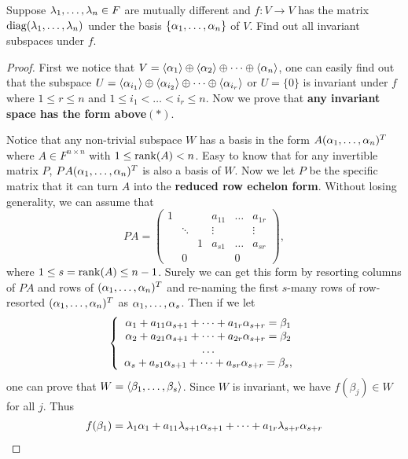 \begin{pro}%
	Suppose $\lambda_1,\dots,\lambda_n\in F$ are mutually different and $f\colon V\to V$ has the matrix $\operatorname*{diag}(\lambda_1,\dots,\lambda_n)$ under the basis $\{\alpha_1,\dots,\alpha_n\}$ of $V$. Find out all invariant subspaces under $f$.
\end{pro}
\begin{proof}
	First we notice that $V=\left\langle \alpha_1\right\rangle\oplus\left\langle \alpha_2\right\rangle\oplus\dots\oplus\left\langle \alpha_n\right\rangle$, one can easily find out that the subspace $U=\left\langle \alpha_{i_1}\right\rangle\oplus\left\langle \alpha_{i_2}\right\rangle\oplus\dots\oplus\left\langle \alpha_{i_r}\right\rangle$ or $U=\{0\}$ is invariant under $f$ where $1\leq r\leq n$ and $1\leq i_1< \dots< i_r\leq n$. Now we prove that \textbf{any invariant space has the form above}\;$(*)$. 

	Notice that any non-trivial subspace $W$ has a basis in the form $A(\alpha_1,\dots,\alpha_n)^T$ where $A\in F^{n\times n}$ with $1\leq \operatorname*{rank}(A)<n$. Easy to know that for any invertible matrix $P$, $PA(\alpha_1,\dots,\alpha_n)^T$ is also a basis of $W$. Now we let $P$ be the specific matrix that it can turn $A$ into the \textbf{reduced row echelon form}. Without losing generality, we can assume that
	\[PA=\begin{pmatrix}
	1 & & & a_{11} & \dots & a_{1r}\\
	  &\ddots &  &\vdots& &\vdots\\
	  & & 1 & a_{s1} & \dots & a_{sr}\\
	  &0&   &        & 0 &\end{pmatrix},\]
	where $1\leq s=\operatorname*{rank}(A)\leq n-1$.
	Surely we can get this form by resorting columns of $PA$ and rows of $(\alpha_1,\dots,\alpha_n)^T$ and re-naming the first $s$-many rows of row-resorted $(\alpha_1,\dots,\alpha_n)^T$ as $\alpha_1,\dots,\alpha_s$. Then if we let
	\[
	\left\{
	\begin{array}{c}
	\begin{matrix}
	\alpha_1+a_{11}\alpha_{s+1}+\dots+a_{1r}\alpha_{s+r}=\beta_1\\
	\alpha_2+a_{21}\alpha_{s+1}+\dots+a_{2r}\alpha_{s+r}=\beta_2\\
	\dots\\
	\alpha_s+a_{s1}\alpha_{s+1}+\dots+a_{sr}\alpha_{s+r}=\beta_s,
	\end{matrix}
	\end{array}
	\right.	
	\]
	one can prove that $W=\left\langle \beta_1,\dots,\beta_s\right\rangle$. Since $W$ is invariant, we have $f(\beta_j)\in W$ for all $j$.
	Thus 
	\begin{align*}
	f(\beta_1)&=\la_1\al_1+a_{11}\la_{s+1}\al_{s+1}+\dots+a_{1r}\la_{s+r}\al_{s+r}\\

\end{align*}
\end{proof}
